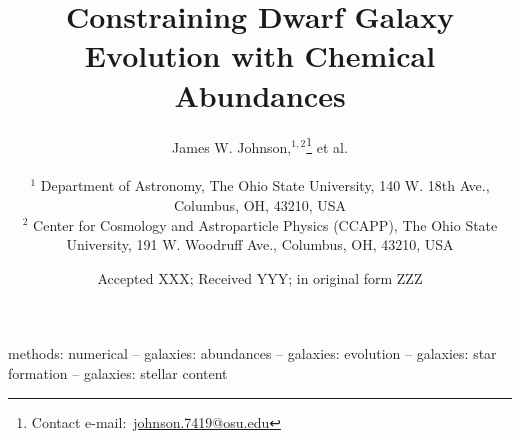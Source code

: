 \documentclass[fleqn, usenatbib]{mnras}
\title[One-Zone Models of Dwarf Galaxies]{Constraining Dwarf Galaxy Evolution
with Chemical Abundances}
\author[J.W. Johnson et al.]{James W. Johnson,$^{1, 2}$\thanks{
	Contact e-mail:~\href{mailto:johnson.7419@osu.edu}{johnson.7419@osu.edu}}
	et al.
	\\ \null \\
	$^{1}$ Department of Astronomy, The Ohio State University,
	140 W. 18th Ave., Columbus, OH, 43210, USA
	\\
	$^{2}$ Center for Cosmology and Astroparticle Physics (CCAPP),
	The Ohio State University, 191 W. Woodruff Ave., Columbus, OH, 43210, USA
}
\date{Accepted XXX; Received YYY; in original form ZZZ}
\begin{document}
\label{firstpage}
\pagerange{\pageref{firstpage}--\pageref{lastpage}}
\maketitle



\begin{keywords}
methods: numerical -- galaxies: abundances -- galaxies: evolution --
galaxies: star formation -- galaxies: stellar content
\end{keywords}













\begin{appendices}


\end{appendices}

\label{lastpage}
\end{document}
